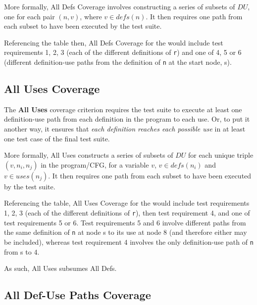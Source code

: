 More formally, All Defs Coverage involves constructing a series of subsets of
$\mathit{DU}$, one for each pair $(n, v)$, where $v \in \mathit{defs}(n)$. It
then requires one path from each subset to have been executed by the test suite.


Referencing the table then, All Defs Coverage for the \signmethod would include
test requirements 1, 2, 3 (each of the different definitions of {\tt r}) and one
of 4, 5 or 6 (different definition-use paths from the definition of {\tt n} at
the start node, s).


\subsection{All Uses Coverage}

The {\bf All Uses} coverage criterion requires the test suite to execute at
least one definition-use path from each definition in the program to each use.
Or, to put it another way, it ensures that {\it each definition reaches each
possible use} in at least one test case of the final test suite. 

More formally, All Uses constructs a series of subsets of $DU$ for each unique
triple $(v, n_i, n_j)$ in the program/CFG, %
for a variable $v$, $v \in \mathit{defs}(n_i)$ and $v \in \mathit{uses}(n_j)$. It then
requires one path from each subset to have been executed by the test suite.


Referencing the table, All Uses Coverage for the \signmethod would include
test requirements 1, 2, 3 (each of the different definitions of {\tt r}), then 
test requirement 4, and one of test requirements 5 or 6. Test requirements 5 and
6 involve different paths from the same definition of {\tt n} at node s to its
use at node 8 (and therefore either may be included), whereas test requirement 4
involves the only definition-use path of {\tt n} from s to 4.

As such, All Uses subsumes All Defs.


\subsection{All Def-Use Paths Coverage}

